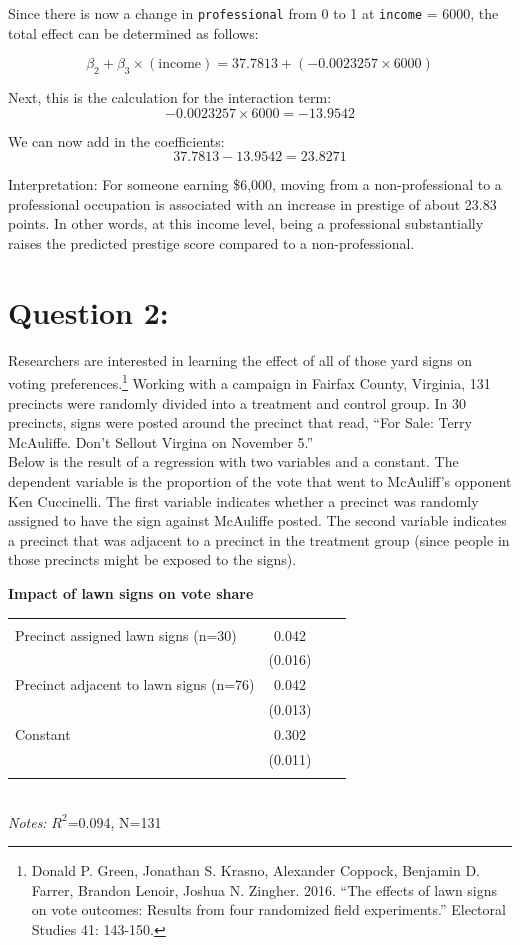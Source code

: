 \documentclass[
]{article}
\begin{document}
Since there is now a change in \texttt{professional} from 0 to 1 at \texttt{income} = 6000, the total effect can be determined as follows:

\[
\beta_2 + \beta_3 \times (\text{income}) = 37.7813 + (-0.0023257 \times 6000)
\]

Next, this is the calculation for the interaction term:  
\[
-0.0023257 \times 6000 = -13.9542
\]

We can now add in the coefficients:  
\[
37.7813 - 13.9542 = 23.8271
\]

\noindent
Interpretation: For someone earning \$6,000, moving from a non-professional to a professional occupation is associated with an increase in prestige of about 23.83 points. In other words, at this income level, being a professional substantially raises the predicted prestige score compared to a non-professional.


\section*{Question 2:} 
\noindent 	Researchers are interested in learning the effect of all of those yard signs on voting preferences.\footnote{Donald P. Green, Jonathan	S. Krasno, Alexander Coppock, Benjamin D. Farrer,	Brandon Lenoir, Joshua N. Zingher. 2016. ``The effects of lawn signs on vote outcomes: Results from four randomized field experiments.'' Electoral Studies 41: 143-150. } Working with a campaign in Fairfax County, Virginia, 131 precincts were randomly divided into a treatment and control group. In 30 precincts, signs were posted around the precinct that read, ``For Sale: Terry McAuliffe. Don't Sellout Virgina on November 5.'' \\

Below is the result of a regression with two variables and a constant.  The dependent variable is the proportion of the vote that went to McAuliff's opponent Ken Cuccinelli. The first variable indicates whether a precinct was randomly assigned to have the sign against McAuliffe posted. The second variable indicates
a precinct that was adjacent to a precinct in the treatment group (since people in those precincts might be exposed to the signs).

\begin{table}[!htbp]
	\centering 
	\textbf{Impact of lawn signs on vote share}\\
	\begin{tabular}{@{\extracolsep{5pt}}lccc} 
		\\[-1.8ex] 
		\hline \\[-1.8ex]
		Precinct assigned lawn signs  (n=30)  & 0.042\\
		& (0.016) \\
		Precinct adjacent to lawn signs (n=76) & 0.042 \\
		&  (0.013) \\
		Constant  & 0.302\\
		& (0.011)
		\\
		\hline \\
	\end{tabular}\\
	\footnotesize{\textit{Notes:} $R^2$=0.094, N=131}
\end{table}
\end{document}
